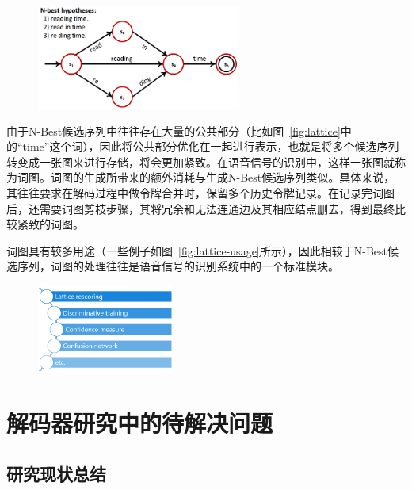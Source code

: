 \begin{figure}[!htp]
  \centering
    \captionstyle{\centering}
    \includegraphics[clip=true, width=0.6\textwidth]{figure/lattice.png}
\end{figure}


由于N-Best候选序列中往往存在大量的公共部分（比如图~\ref{fig:lattice}中的“time”这个词），因此将公共部分优化在一起进行表示，也就是将多个候选序列转变成一张图来进行存储，将会更加紧致。在语音信号的识别中，这样一张图就称为词图。词图的生成所带来的额外消耗与生成N-Best候选序列类似。具体来说，其往往要求在解码过程中做令牌合并时，保留多个历史令牌记录。在记录完词图后，还需要词图剪枝步骤，其将冗余和无法连通边及其相应结点删去，得到最终比较紧致的词图。

词图具有较多用途（一些例子如图~\ref{fig:lattice-usage}所示），因此相较于N-Best候选序列，词图的处理往往是语音信号的识别系统中的一个标准模块。

\begin{figure}[!htp]
  \centering
    \captionstyle{\centering}
    \includegraphics[clip=true, width=0.4\textwidth]{figure/lattice_usage.png}
\end{figure}



\section{解码器研究中的待解决问题}
\label{chap:intro2-dec-future}
\subsection{研究现状总结}
\label{chap:intro2-dec-sumcur}


